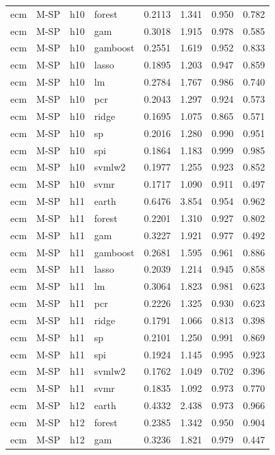 \begin{ThreePartTable}
\begin{longtable}[t]{llclcccc}
ecm & M-SP & h10 & forest & 0.2113 & 1.341 & 0.950 & 0.782\\
ecm & M-SP & h10 & gam & 0.3018 & 1.915 & 0.978 & 0.585\\
ecm & M-SP & h10 & gamboost & 0.2551 & 1.619 & 0.952 & 0.833\\
ecm & M-SP & h10 & lasso & 0.1895 & 1.203 & 0.947 & 0.859\\
ecm & M-SP & h10 & lm & 0.2784 & 1.767 & 0.986 & 0.740\\
ecm & M-SP & h10 & pcr & 0.2043 & 1.297 & 0.924 & 0.573\\
ecm & M-SP & h10 & ridge & 0.1695 & 1.075 & 0.865 & 0.571\\
ecm & M-SP & h10 & sp & 0.2016 & 1.280 & 0.990 & 0.951\\
ecm & M-SP & h10 & spi & 0.1864 & 1.183 & 0.999 & 0.985\\
ecm & M-SP & h10 & svmlw2 & 0.1977 & 1.255 & 0.923 & 0.852\\
ecm & M-SP & h10 & svmr & 0.1717 & 1.090 & 0.911 & 0.497\\
\addlinespace
ecm & M-SP & h11 & earth & 0.6476 & 3.854 & 0.954 & 0.962\\
ecm & M-SP & h11 & forest & 0.2201 & 1.310 & 0.927 & 0.802\\
ecm & M-SP & h11 & gam & 0.3227 & 1.921 & 0.977 & 0.492\\
ecm & M-SP & h11 & gamboost & 0.2681 & 1.595 & 0.961 & 0.886\\
ecm & M-SP & h11 & lasso & 0.2039 & 1.214 & 0.945 & 0.858\\
ecm & M-SP & h11 & lm & 0.3064 & 1.823 & 0.981 & 0.623\\
ecm & M-SP & h11 & pcr & 0.2226 & 1.325 & 0.930 & 0.623\\
ecm & M-SP & h11 & ridge & 0.1791 & 1.066 & 0.813 & 0.398\\
ecm & M-SP & h11 & sp & 0.2101 & 1.250 & 0.991 & 0.869\\
ecm & M-SP & h11 & spi & 0.1924 & 1.145 & 0.995 & 0.923\\
ecm & M-SP & h11 & svmlw2 & 0.1762 & 1.049 & 0.702 & 0.396\\
ecm & M-SP & h11 & svmr & 0.1835 & 1.092 & 0.973 & 0.770\\
\addlinespace
ecm & M-SP & h12 & earth & 0.4332 & 2.438 & 0.973 & 0.966\\
ecm & M-SP & h12 & forest & 0.2385 & 1.342 & 0.950 & 0.904\\
ecm & M-SP & h12 & gam & 0.3236 & 1.821 & 0.979 & 0.447\\

\end{longtable}
\end{ThreePartTable}
